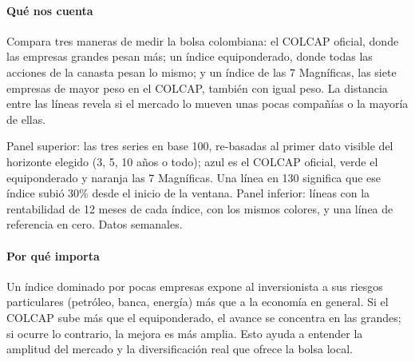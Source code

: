 \paragraph{Qué nos cuenta}
Compara tres maneras de medir la bolsa colombiana: el COLCAP oficial, donde las empresas grandes pesan más; un índice equiponderado, donde todas las acciones de la canasta pesan lo mismo; y un índice de las 7 Magníficas, las siete empresas de mayor peso en el COLCAP, también con igual peso. La distancia entre las líneas revela si el mercado lo mueven unas pocas compañías o la mayoría de ellas.

\begin{leer}
Panel superior: las tres series en base 100, re-basadas al primer dato visible del horizonte elegido (3, 5, 10 años o todo); azul es el COLCAP oficial, verde el equiponderado y naranja las 7 Magníficas. Una línea en 130 significa que ese índice subió 30\% desde el inicio de la ventana. Panel inferior: líneas con la rentabilidad de 12 meses de cada índice, con los mismos colores, y una línea de referencia en cero. Datos semanales.
\end{leer}

\paragraph{Por qué importa}
Un índice dominado por pocas empresas expone al inversionista a sus riesgos particulares (petróleo, banca, energía) más que a la economía en general. Si el COLCAP sube más que el equiponderado, el avance se concentra en las grandes; si ocurre lo contrario, la mejora es más amplia. Esto ayuda a entender la amplitud del mercado y la diversificación real que ofrece la bolsa local.

